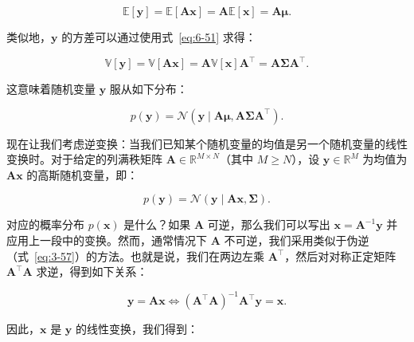 \begin{equation}
\mathbb{E}[\boldsymbol{y}] = \mathbb{E}[\boldsymbol{A} \boldsymbol{x}] = \boldsymbol{A} \mathbb{E}[\boldsymbol{x}] = \boldsymbol{A} \boldsymbol{\mu} .
\tag{6.86}\label{eq:6-86}
\end{equation}

类似地，$ \boldsymbol{y} $ 的方差可以通过使用式~\eqref{eq:6-51} 求得：

\begin{equation}
\mathbb{V}[\boldsymbol{y}] = \mathbb{V}[\boldsymbol{A} \boldsymbol{x}] = \boldsymbol{A} \mathbb{V}[\boldsymbol{x}] \boldsymbol{A}^\top = \boldsymbol{A} \boldsymbol{\Sigma} \boldsymbol{A}^\top .
\tag{6.87}\label{eq:6-87}
\end{equation}

这意味着随机变量 $ \boldsymbol{y} $ 服从如下分布：

\begin{equation}
p(\boldsymbol{y}) = \mathcal{N}(\boldsymbol{y} \mid \boldsymbol{A} \boldsymbol{\mu}, \boldsymbol{A} \boldsymbol{\Sigma} \boldsymbol{A}^\top) .
\tag{6.88}\label{eq:6-88}
\end{equation}

现在让我们考虑逆变换：当我们已知某个随机变量的均值是另一个随机变量的线性变换时。对于给定的列满秩矩阵 $ \boldsymbol{A} \in \mathbb{R}^{M \times N} $（其中 $ M \geqslant N $），设 $ \boldsymbol{y} \in \mathbb{R}^M $ 为均值为 $ \boldsymbol{A} \boldsymbol{x} $ 的高斯随机变量，即：

\begin{equation}
p(\boldsymbol{y}) = \mathcal{N}(\boldsymbol{y} \mid \boldsymbol{A} \boldsymbol{x}, \boldsymbol{\Sigma}) .
\tag{6.89}\label{eq:6-89}
\end{equation}

对应的概率分布 $ p(\boldsymbol{x}) $ 是什么？如果 $ \boldsymbol{A} $ 可逆，那么我们可以写出 $ \boldsymbol{x} = \boldsymbol{A}^{-1} \boldsymbol{y} $ 并应用上一段中的变换。然而，通常情况下 $ \boldsymbol{A} $ 不可逆，我们采用类似于伪逆（式~\eqref{eq:3-57}）的方法。也就是说，我们在两边左乘 $ \boldsymbol{A}^\top $，然后对对称正定矩阵 $ \boldsymbol{A}^\top \boldsymbol{A} $ 求逆，得到如下关系：

\begin{equation}
\boldsymbol{y} = \boldsymbol{A} \boldsymbol{x} \iff (\boldsymbol{A}^\top \boldsymbol{A})^{-1}\boldsymbol{A}^\top \boldsymbol{y} = \boldsymbol{x} .
\tag{6.90}\label{eq:6-90}
\end{equation}

因此，$ \boldsymbol{x} $ 是 $ \boldsymbol{y} $ 的线性变换，我们得到：

